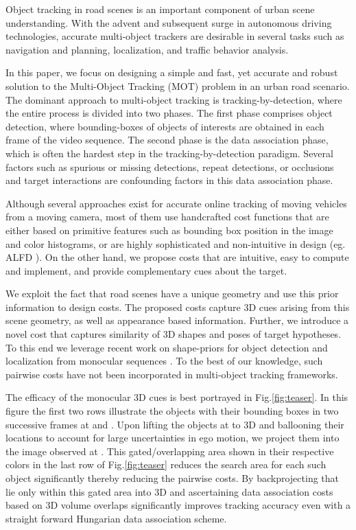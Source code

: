 \documentclass[letterpaper, 10 pt, conference]{ieeeconf}
\begin{document}
Object tracking in road scenes is an important component of urban scene understanding. With the advent and subsequent surge in autonomous driving technologies, accurate multi-object trackers are desirable in several tasks such as navigation and planning, localization, and traffic behavior analysis.

In this paper, we focus on designing a simple and fast, yet accurate and robust solution to the Multi-Object Tracking (MOT) problem in an urban road scenario. The dominant approach to multi-object tracking is tracking-by-detection, where the entire process is divided into two phases. The first phase comprises object detection, where bounding-boxes of objects of interests are obtained in each frame of the video sequence. The second phase is the data association phase, which is often the hardest step in the tracking-by-detection paradigm. Several factors such as spurious or missing detections, repeat detections, or occlusions and target interactions are confounding factors in this data association phase. 

Although several approaches \cite{DeepNetworkFlow,eccv2016,ijcv2017,greedyTracker,survey} exist for accurate online tracking of moving vehicles from a moving camera, most of them \cite{NOMT,eccv2016} use handcrafted cost functions that are either based on primitive features such as bounding box position in the image and color histograms, or are highly sophisticated and non-intuitive in design (eg. ALFD \cite{NOMT}). On the other hand, we propose costs that are intuitive, easy to compute and implement, and provide complementary cues about the target.

We exploit the fact that road scenes have a unique geometry and use this prior information to design costs. The proposed costs capture 3D cues arising from this scene geometry, as well as appearance based information. Further, we introduce a novel cost that captures similarity of 3D shapes and poses of target hypotheses. To this end we leverage recent work on shape-priors for object detection and localization from monocular sequences \cite{KM_ICRA,KM_IROS}. To the best of our knowledge, such pairwise costs have not been incorporated in multi-object tracking frameworks.

The efficacy of the monocular 3D cues is best portrayed in Fig.\ref{fig:teaser}. In this figure the first two rows illustrate the objects with their bounding boxes in two successive frames at  and . Upon lifting the objects at  to 3D and ballooning their locations to account for large uncertainties in ego motion, we project them into the image observed at . This gated/overlapping area shown in their respective colors in the last row of Fig.\ref{fig:teaser} reduces the search area for each such object significantly thereby reducing the pairwise costs. By backprojecting that lie only within this gated area into 3D and ascertaining data association costs based on 3D volume overlaps significantly improves tracking accuracy even with a straight forward Hungarian data association scheme.
\end{document}
